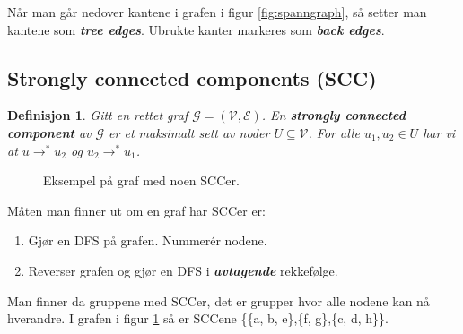 \documentclass[11pt,a4paper]{article}
\theoremstyle{def}
\begin{document}
Når man går nedover kantene i grafen i figur \ref{fig:spanngraph}, så setter man kantene som \textit{\textbf{tree edges}}. Ubrukte kanter markeres som \textit{\textbf{back edges}}.

\subsection{Strongly connected components (SCC)}
\theoremstyle{mytheoremstyle}
\newtheorem{scc}{Definisjon}[subsection]
\begin{scc}
Gitt en rettet graf $\mathcal{G} = (\mathcal{V}, \mathcal{E})$. En \textbf{strongly connected component} av $\mathcal{G}$ er et maksimalt sett av noder $U \subseteq \mathcal{V}$. For alle $u_1, u_2 \in U$ har vi at $u \rightarrow^*u_2$ og $u_2\rightarrow^*u_1$.
\end{scc}

\begin{figure}[h!]
\centering
{}
\caption{Eksempel på graf med noen SCCer.}
\label{fig:scc}
\end{figure}

Måten man finner ut om en graf har SCCer er:
\begin{enumerate}
\item
Gjør en DFS på grafen. Nummerér nodene.
\item
Reverser grafen og gjør en DFS i \textit{\textbf{avtagende}} rekkefølge.
\end{enumerate}
Man finner da gruppene med SCCer, det er grupper hvor alle nodene kan nå hverandre. I grafen i figur \ref{fig:scc} så er SCCene \{\{a, b, e\},\{f, g\},\{c, d, h\}\}.
\end{document}
